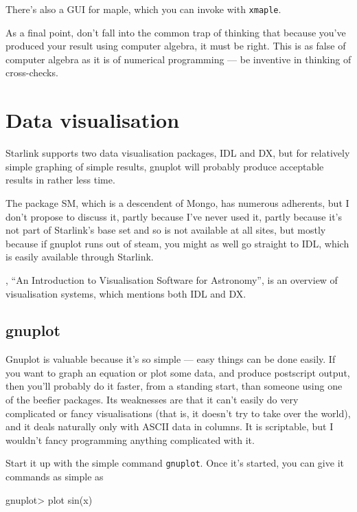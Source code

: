 \documentclass[11pt,oneside,chapters]{starlink}
\begin{document}
There's also a GUI for maple, which you can invoke with
\texttt{xmaple}.

As a final point, don't fall into the common trap of thinking that because
you've produced your result using computer algebra, it must be right.
This is as false of computer algebra as it is of numerical
programming --- be inventive in thinking of cross-checks.


\section{Data visualisation}
\label{s:visualisation}

Starlink supports two data visualisation packages, IDL and
DX, but for relatively simple graphing of simple results,
gnuplot will probably produce acceptable results in rather
less time.

The package SM, which is a descendent of
Mongo, has numerous adherents, but I don't propose to
discuss it, partly because I've never used it, partly
because it's not part of Starlink's base set and so is not
available at all sites, but mostly because if gnuplot runs
out of steam, you might as well go straight to IDL, which is
easily available through Starlink.

, ``An Introduction to
Visualisation Software for Astronomy'', is an overview
of visualisation systems, which mentions both IDL and
DX.

\subsection{gnuplot}
\label{s:gausssine-g}

Gnuplot is valuable because it's so simple --- easy things
can be done easily.  If you want to graph an equation or
plot some data, and produce postscript output, then you'll
probably do it faster, from a standing start, than someone
using one of the beefier packages.  Its weaknesses are
that it can't easily do very complicated or fancy
visualisations (that is, it doesn't try to take over the
world), and it deals naturally only with ASCII data in
columns.  It is scriptable, but I wouldn't fancy
programming anything complicated with it.

Start it up with the simple command \texttt{gnuplot}.
Once it's started, you can give it commands as simple as

\begin{terminalv}
gnuplot> plot sin(x)
\end{terminalv}
\end{document}
